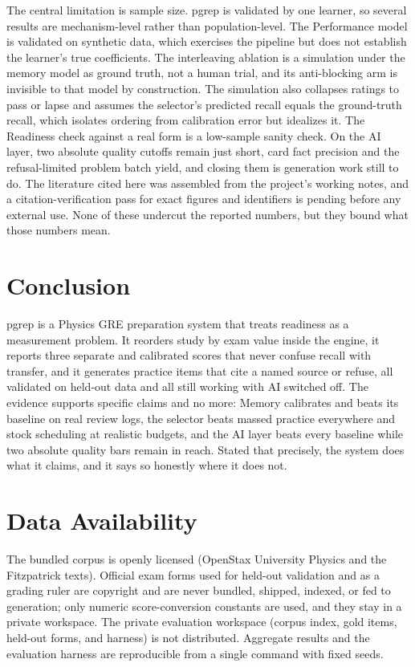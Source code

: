 \documentclass[11pt]{article}
\begin{document}
The central limitation is sample size. pgrep is validated by one learner, so several
results are mechanism-level rather than population-level. The Performance model is
validated on synthetic data, which exercises the pipeline but does not establish the
learner's true coefficients. The interleaving ablation is a simulation under the
memory model as ground truth, not a human trial, and its anti-blocking arm is invisible
to that model by construction. The simulation also collapses ratings to pass or lapse
and assumes the selector's predicted recall equals the ground-truth recall, which
isolates ordering from calibration error but idealizes it. The Readiness check against a real form is a low-sample
sanity check. On the AI layer, two absolute quality cutoffs remain just short, card
fact precision and the refusal-limited problem batch yield, and closing them is
generation work still to do. The literature cited here was assembled from the
project's working notes, and a citation-verification pass for exact figures and
identifiers is pending before any external use. None of these undercut the reported
numbers, but they bound what those numbers mean.

\section{Conclusion}

pgrep is a Physics GRE preparation system that treats readiness as a measurement
problem. It reorders study by exam value inside the engine, it reports three separate
and calibrated scores that never confuse recall with transfer, and it generates
practice items that cite a named source or refuse, all validated on held-out data and
all still working with AI switched off. The evidence supports specific claims and no
more: Memory calibrates and beats its baseline on real review logs, the selector beats
massed practice everywhere and stock scheduling at realistic budgets, and the AI layer
beats every baseline while two absolute quality bars remain in reach. Stated that
precisely, the system does what it claims, and it says so honestly where it does not.

\section*{Data Availability}

The bundled corpus is openly licensed (OpenStax University Physics and the Fitzpatrick
texts). Official exam forms used for held-out validation and as a grading ruler are
copyright and are never bundled, shipped, indexed, or fed to generation; only numeric
score-conversion constants are used, and they stay in a private workspace. The private
evaluation workspace (corpus index, gold items, held-out forms, and harness) is not
distributed. Aggregate results and the evaluation harness are reproducible from a
single command with fixed seeds.
\end{document}
